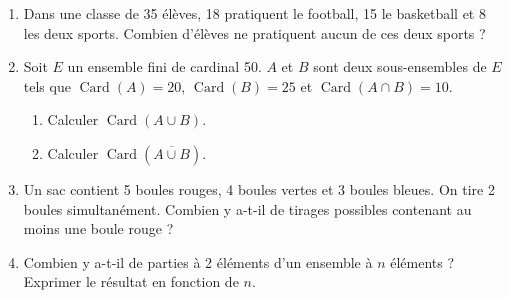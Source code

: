 \documentclass[11pt]{article}
\begin{document}
\begin{exercice}
\begin{enumerate}
    \item Dans une classe de 35 élèves, 18 pratiquent le football, 15 le basketball et 8 les deux sports. Combien d'élèves ne pratiquent aucun de ces deux sports ?
    \item Soit $E$ un ensemble fini de cardinal 50. $A$ et $B$ sont deux sous-ensembles de $E$ tels que $\operatorname{Card}(A)=20$, $\operatorname{Card}(B)=25$ et $\operatorname{Card}(A \cap B)=10$.
    \begin{enumerate}
        \item Calculer $\operatorname{Card}(A \cup B)$.
        \item Calculer $\operatorname{Card}(\overline{A \cup B})$.
    \end{enumerate}
    \item Un sac contient 5 boules rouges, 4 boules vertes et 3 boules bleues. On tire 2 boules simultanément. Combien y a-t-il de tirages possibles contenant au moins une boule rouge ?
    \item Combien y a-t-il de parties à 2 éléments d'un ensemble à $n$ éléments ? Exprimer le résultat en fonction de $n$.
\end{enumerate}
\end{exercice}
\end{document}
